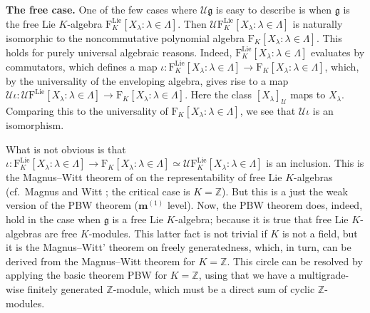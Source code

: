 \documentclass[11pt,a4paper]{amsart}
\DeclareMathOperator{\Lie}{Lie}
\newcommand{\bo}{\boldsymbol}
\theoremstyle{definition}
\theoremstyle{plain}
\begin{document}
\textbf{The free case.}
One of the few cases where $\mathcal U\mathfrak g$ is easy to describe is
 when $\mathfrak g$ is the free Lie $K$-algebra $\mathrm F_K^{\Lie}[X_\lambda : \lambda\in\Lambda]$.
Then $\mathcal U\mathrm F_K^{\Lie}[X_\lambda : \lambda\in\Lambda]$ is naturally isomorphic to the noncommutative
 polynomial algebra $\mathrm F_K[X_\lambda : \lambda\in\Lambda]$.
This holds for purely universal algebraic reasons. Indeed, $\mathrm F_K^{\Lie}[X_\lambda : \lambda\in\Lambda]$ evaluates
 by commutators, which defines a map
 $\iota:\mathrm F_K^{\Lie}[X_\lambda : \lambda\in\Lambda]\rightarrow \mathrm F_K[X_\lambda : \lambda\in\Lambda]$,
 which, by the universality of the enveloping algebra, gives rise to a map
 $\mathcal U \iota:\mathcal U\mathrm F^{\Lie}[X_\lambda : \lambda\in\Lambda]\rightarrow \mathrm F_K[X_\lambda : \lambda\in\Lambda]$.
Here the class $[X_\lambda]_{\mathcal U}$ maps to $X_\lambda$.
Comparing this to the universality of $\mathrm F_K[X_\lambda : \lambda\in\Lambda]$, we see that $\mathcal U \iota$ is an isomorphism.

What is not obvious is that
 $\iota:\mathrm F_K^{\Lie}[X_\lambda : \lambda\in\Lambda]\rightarrow
 \mathrm F_K[X_\lambda : \lambda\in\Lambda]\simeq\mathcal U\mathrm F_K^{\Lie}[X_\lambda : \lambda\in\Lambda]$
 is an inclusion.
This is the Magnus--Witt theorem of on the representability of free Lie $K$-algebras
 (cf.~Magnus \cite{MM} and Witt \cite{W}; the critical case is $K=\mathbb Z$).
But this is a just the weak version of the PBW theorem ($\bo m^{(1)}$ level).
Now, the PBW theorem does, indeed, hold in the case when $\mathfrak g$ is a free Lie $K$-algebra;
 because it is true that free Lie $K$-algebras are free $K$-modules.
This latter fact is not trivial if $K$ is not a field, but it is the Magnus--Witt' theorem on freely generatedness,
 which, in turn, can be derived from the  Magnus--Witt theorem for $K=\mathbb Z$.
This circle can be resolved by applying the basic theorem PBW  for $K=\mathbb Z$,
 using that we have a multigrade-wise finitely generated $\mathbb Z$-module,
 which must be a direct sum of cyclic $\mathbb Z$-modules.
\end{document}
